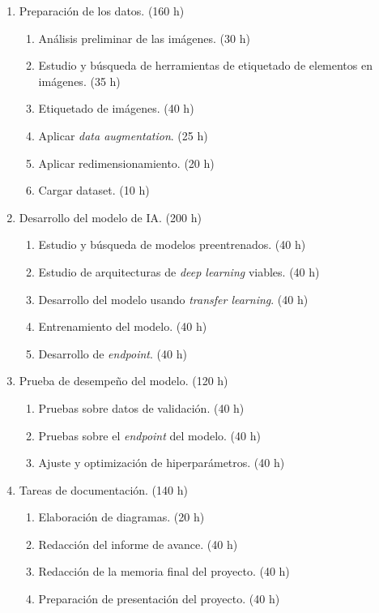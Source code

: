 \documentclass[
11pt, %
codirector, %
]{charter}
\begin{document}
\begin{enumerate}
\item Preparación de los datos. (160 h)
	\begin{enumerate}
	\item Análisis preliminar de las imágenes. (30 h)
	\item Estudio y búsqueda de herramientas de etiquetado de elementos en imágenes. (35 h)
	\item Etiquetado de imágenes. (40 h)
	\item Aplicar \textit{data augmentation}. (25 h)
	\item Aplicar redimensionamiento. (20 h)
	\item Cargar dataset. (10 h)
	\end{enumerate}
\item Desarrollo del modelo de IA. (200 h)
	\begin{enumerate}
	\item Estudio y búsqueda de modelos preentrenados. (40 h)
	\item Estudio de arquitecturas de \textit{deep learning} viables. (40 h)
	\item Desarrollo del modelo usando \textit{transfer learning}. (40 h)
	\item Entrenamiento del modelo. (40 h)
	\item Desarrollo de \textit{endpoint}. (40 h)
	\end{enumerate}
\item Prueba de desempeño del modelo. (120 h)
	\begin{enumerate}
	\item Pruebas sobre datos de validación.  (40 h)
	\item Pruebas sobre el \textit{endpoint} del modelo. (40 h)
	\item Ajuste y optimización de hiperparámetros. (40 h)
	\end{enumerate}
\item Tareas de documentación. (140 h)
	\begin{enumerate}
	\item Elaboración de diagramas. (20 h)
	\item Redacción del informe de avance. (40 h)
	\item Redacción de la memoria final del proyecto. (40 h)
	\item Preparación de presentación del proyecto. (40 h)
	\end{enumerate}
\end{enumerate}
\end{document}
